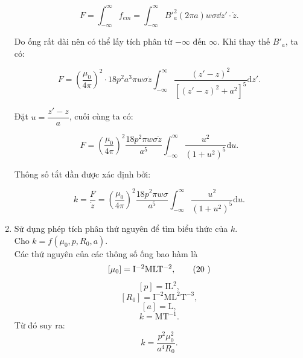 \begin{loigiai}
\begin{enumerate}[1)]
    \[F=\int_{-\infty}^\infty f_{em}=\int_{-\infty}^\infty B'^2_{a}(2\pi a)w\sigma\dd z'\cdot\Dot{z}.\]
    
    Do ống rất dài nên có thể lấy tích phân từ $-\infty$ đến $\infty$. Khi thay thế $B'_{a}$, ta có:
    
    \[F=\left(\dfrac{\mu_0}{4\pi}\right)^2\cdot18p^2a^3\pi w\sigma \Dot{z}\int_{-\infty}^\infty \dfrac{(z'-z)^2}{[(z'-z)^2+a^2]^5}\mathrm{d}z'.\]
    
    Đặt $u=\dfrac{z'-z}{a}$, cuối cùng ta có:
    
    \[F=\left(\dfrac{\mu_0}{4\pi}\right)^2\dfrac{18p^2\pi w\sigma\Dot{z}}{a^5}\int_{-\infty}^\infty\dfrac{u^2}{(1+u^2)^5}\mathrm{d}u. \tag{18} \label{apho12sa.18} \]
    
    Thông số tắt dần được xác định bởi:
    
    \[k=\dfrac{F}{\Dot{z}}=\left(\dfrac{\mu_0}{4\pi}\right)^2\dfrac{18p^2\pi w\sigma}{a^5}\int_{-\infty}^\infty\dfrac{u^2}{(1+u^2)^5}\mathrm{d}u. \tag{19} \label{apho12sa.19}\]
    
    \item Sử dụng phép tích phân thứ nguyên để tìm biểu thức của $k$.\\
    Cho $k=f(\mu_0,p,R_0,a)$.\\
    Các thứ nguyên của các thông số ống bao hàm là
    \[[\mu_0]=\mathrm{I^{-2}MLT^{-2}}, \tag{20 \label{apho12sa.20}}\]
    \[[p]=\mathrm{IL^2}, \tag{21} \label{apho12sa.21}\]
    \[[R_0]=\mathrm{I^{-2}ML^2T^{-3}}, \tag{22} \label{apho12sa.22}\]
    \[[a]=\mathrm{L}, \tag{23} \label{apho12sa.23}\]
    \[k=\mathrm{MT^{-1}}. \tag{24} \label{apho12sa.24}\]
    Từ đó suy ra:
    \[k=\dfrac{p^2\mu_0^2}{a^4R_0}. \tag{25} \label{apho12sa.25}\]
\end{enumerate}
\end{loigiai}


